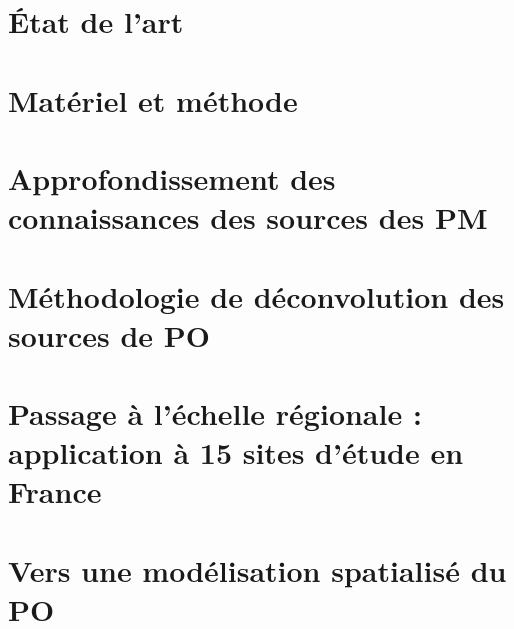 \documentclass[a4paper,12pt]{book}
\begin{document}
\chapter{État de l'art}
\label{cha:etat_de_lart}
\PartialToc
\clearpage

\clearpage
\printbibliography[segment=\therefsegment,heading=subbibliography]

\chapter{Matériel et méthode}
\label{cha:materiel_et_methode}
\PartialToc
\clearpage

\clearpage
\printbibliography[segment=\therefsegment,heading=subbibliography]

\chapter{Approfondissement des connaissances des sources des PM}%
\label{cha:approfondissement_des_connaissances_des_sources_des_pm}
\PartialToc
\clearpage

\clearpage
\printbibliography[segment=\therefsegment,heading=subbibliography]

\chapter{Méthodologie de déconvolution des sources de PO}
\label{cha:methodology_for_the_attribution_of_intrisinc_op_to_a_pm_source}
\PartialToc
\clearpage

\clearpage
\printbibliography[segment=\therefsegment,heading=subbibliography]

\chapter{Passage à l'échelle régionale : application à 15 sites d'étude en France}
\label{cha:application_to_15_sites_in_France}
\PartialToc
\clearpage
% 

\chapter{Vers une modélisation spatialisé du PO}
\label{cha:spatio_temporal_modelizing}
\PartialToc
\clearpage
% 

\printbibliography
\end{document}

